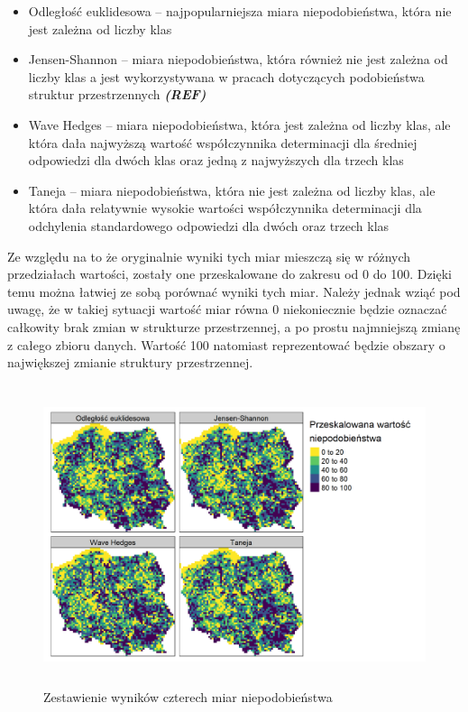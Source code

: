 \documentclass{amuthesis}
\begin{document}
\begin{itemize}
\tightlist
\item
  Odległość euklidesowa -- najpopularniejsza miara niepodobieństwa,
  która nie jest zależna od liczby klas
\item
  Jensen-Shannon -- miara niepodobieństwa, która również nie jest
  zależna od liczby klas a jest wykorzystywana w pracach dotyczących
  podobieństwa struktur przestrzennych \textbf{\emph{(REF)}}
\item
  Wave Hedges -- miara niepodobieństwa, która jest zależna od liczby
  klas, ale która dała najwyższą wartość współczynnika determinacji dla
  średniej odpowiedzi dla dwóch klas oraz jedną z najwyższych dla trzech
  klas
\item
  Taneja -- miara niepodobieństwa, która nie jest zależna od liczby
  klas, ale która dała relatywnie wysokie wartości współczynnika
  determinacji dla odchylenia standardowego odpowiedzi dla dwóch oraz
  trzech klas
\end{itemize}

Ze względu na to że oryginalnie wyniki tych miar mieszczą się w różnych
przedziałach wartości, zostały one przeskalowane do zakresu od 0 do 100.
Dzięki temu można łatwiej ze sobą porównać wyniki tych miar. Należy
jednak wziąć pod uwagę, że w takiej sytuacji wartość miar równa 0
niekoniecznie będzie oznaczać całkowity brak zmian w strukturze
przestrzennej, a po prostu najmniejszą zmianę z całego zbioru danych.
Wartość 100 natomiast reprezentować będzie obszary o największej zmianie
struktury przestrzennej.

\begin{figure}[t]

{\centering \includegraphics[width=5.20833in,height=3.46875in]{figures/zestawienie_miar1.png}

}

\caption{\label{fig-zestawienie_miar1}Zestawienie wyników czterech miar
niepodobieństwa}

\end{figure}
\end{document}
